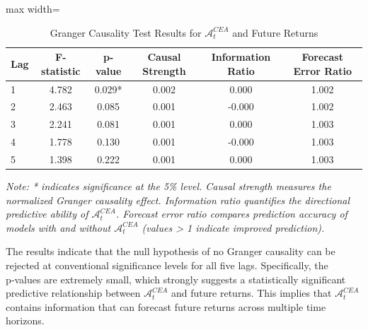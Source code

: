\documentclass[preprint,12pt,authoryear]{elsarticle}
\begin{document}
\begin{table}[h!]
\centering
\caption{Granger Causality Test Results for \(\mathcal{A}^{CEA}_t\) and Future Returns}
\label{tab:granger}
\begin{adjustbox}{max width=\linewidth}
\begin{tabular}{l c c c c c}
\toprule
\textbf{Lag} & \textbf{F-statistic} & \textbf{p-value} & \textbf{Causal Strength} & \textbf{Information Ratio} & \textbf{Forecast Error Ratio} \\
\midrule
1 & 4.782 & 0.029* & 0.002 & 0.000 & 1.002 \\
2 & 2.463 & 0.085 & 0.001 & -0.000 & 1.002 \\
3 & 2.241 & 0.081 & 0.001 & 0.000 & 1.003 \\
4 & 1.778 & 0.130 & 0.001 & -0.000 & 1.003 \\
5 & 1.398 & 0.222 & 0.001 & 0.000 & 1.003 \\
\bottomrule
\end{tabular}
\end{adjustbox}
\vspace{0.1cm}
\raggedright\footnotesize{\textit{Note: * indicates significance at the 5\% level. Causal strength measures the normalized Granger causality effect. Information ratio quantifies the directional predictive ability of \(\mathcal{A}^{CEA}_t\). Forecast error ratio compares prediction accuracy of models with and without \(\mathcal{A}^{CEA}_t\) (values > 1 indicate improved prediction).}}
\end{table}

The results indicate that the null hypothesis of no Granger causality can be rejected at conventional significance levels for all five lags. Specifically, the p‑values are extremely small, which strongly suggests a statistically significant predictive relationship between $ \mathcal{A}^{CEA}_t $ and future returns. This implies that $ \mathcal{A}^{CEA}_t $ contains information that can forecast future returns across multiple time horizons.
\end{document}
